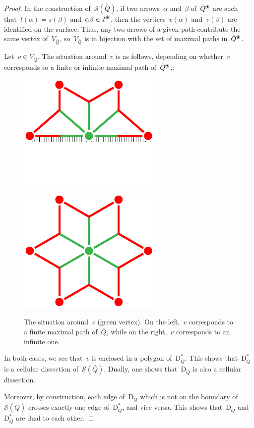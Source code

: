 \documentclass{amsart}
\theoremstyle{definition}
\newcommand{\blossom}{^\text{\ding{96}}} %
\newcommand{\surface}{\mathcal{S}} %
\newcommand{\dual}{^*} %
\newcommand{\dissection}{\mathrm{D}} %
\begin{document}
\begin{proof}
In the construction of~$\surface(\bar Q)$, if two arrows~$\alpha$ and~$\beta$ of~$\bar Q \blossom$ are such that~$t(\alpha) = s(\beta)$ and~$\alpha\beta\in I\blossom$, then the vertices~$v(\alpha)$ and~$v(\beta)$ are identified on the surface.
Thus, any two arrows of a given path contribute the same vertex of~$V_{\bar Q}$, so~$V_{\bar Q}$ is in bijection with the set of maximal paths in~$\bar Q\blossom$.

Let~$v\in V_{\bar Q}$. The situation around~$v$ is as follows, depending on whether~$v$ corresponds to a finite or infinite maximal path of~$\bar Q\blossom$,:

\begin{figure}[h]
	\capstart
	\centerline{\includegraphics[scale=.7]{halfStar} \qquad \includegraphics[scale=.7]{star}}
	\caption{The situation around~$v$ (green vertex). On the left,~$v$ corresponds to a finite maximal path of~$\bar Q$, while on the right,~$v$ corresponds to an infinite one.}
	\label{fig:stars}
\end{figure}

In both cases, we see that~$v$ is enclosed in a polygon of~$\dissection_{\bar Q}\dual$.  This shows that~$\dissection_{\bar Q}\dual$ is a cellular dissection of~$\surface(\bar Q)$.
Dually, one shows that~$\dissection_{\bar Q}$ is also a cellular dissection.

Moreover, by construction, each edge of~$\dissection_{\bar Q}$ which is not on the boundary of~$\surface(\bar Q)$ crosses exactly one edge of~$\dissection_{\bar Q}\dual$, and vice versa.
This shows that~$\dissection_{\bar Q}$ and~$\dissection_{\bar Q}\dual$ are dual to each other.
\end{proof}
\end{document}
